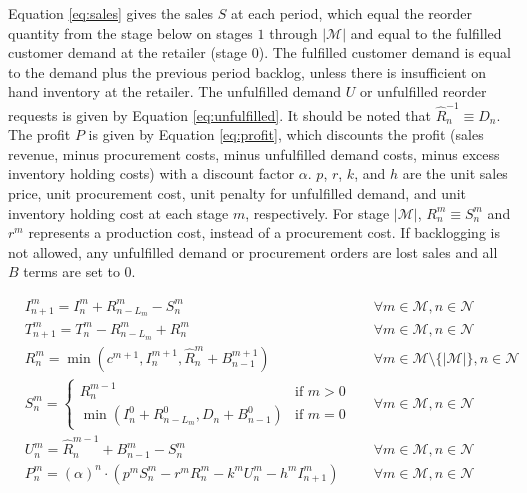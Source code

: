 \documentclass[12pt]{article}
\begin{document}
Equation \ref{eq:sales} gives the sales $S$ at each period, which equal the reorder quantity from the stage below on stages $1$ through $|\mathcal{M}|$ and equal to the fulfilled customer demand at the retailer (stage $0$). The fulfilled customer demand is equal to the demand plus the previous period backlog, unless there is insufficient on hand inventory at the retailer. The unfulfilled demand $U$ or unfulfilled reorder requests is given by Equation \ref{eq:unfulfilled}. It should be noted that $\hat{R}^{-1}_n \equiv D_n$. The profit $P$ is given by Equation \ref{eq:profit}, which discounts the profit (sales revenue, minus procurement costs, minus unfulfilled demand costs, minus excess inventory holding costs) with a discount factor $\alpha$. $p$, $r$, $k$, and $h$ are the unit sales price, unit procurement cost, unit penalty for unfulfilled demand, and unit inventory holding cost at each stage $m$, respectively. For stage $|\mathcal{M}|$, $R^m_n \equiv S^m_n$ and $r^m$ represents a production cost, instead of a procurement cost. If backlogging is not allowed, any unfulfilled demand or procurement orders are lost sales and all $B$ terms are set to 0.

\begin{align}
    & I^m_{n+1} = I^m_n + R^m_{n-L_m} - S^m_n && \forall m \in \mathcal{M}, n \in \mathcal{N} \label{eq:invbal} \\
    & T^m_{n+1} = T^m_n - R^m_{n-L_m} + R^m_n && \forall m \in \mathcal{M}, n \in \mathcal{N} \label{eq:pipebal} \\
    & R^m_n = \min\left(c^{m+1},I^{m+1}_n,\hat{R}^m_n + B^{m+1}_{n-1}\right) && \forall m \in \mathcal{M} \setminus \{|\mathcal{M}|\}, n \in \mathcal{N} \label{eq:reorder} \\
    & S^m_n = 
    \begin{cases}
        R^{m-1}_n & \text{if $m>0$}\\
        \min\left(I^0_n + R^0_{n-L_m},D_n + B^0_{n-1}\right) & \text{if $m=0$}
    \end{cases}
    && \forall m \in \mathcal{M}, n \in \mathcal{N} \label{eq:sales} \\
    & U^m_n = \hat{R}^{m-1}_n + B^m_{n-1} - S^m_n && \forall m \in \mathcal{M}, n \in \mathcal{N} \label{eq:unfulfilled} \\
    & P^m_n = (\alpha)^n \cdot \left(p^m S^m_n -  r^m R^m_n - k^m U^m_n - h^m I^m_{n+1}\right) && \forall m \in \mathcal{M}, n \in \mathcal{N} \label{eq:profit}
\end{align}
\end{document}
